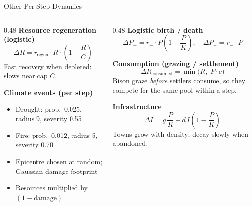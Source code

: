 \documentclass[aspectratio=169]{beamer}
\begin{document}
\begin{frame}{Other Per-Step Dynamics}
  \begin{columns}[T]
    \begin{column}{0.48\textwidth}
      \textbf{Resource regeneration (logistic)}
      \[
        \Delta R = r_\mathrm{regen}\cdot R\cdot\!\left(1 - \frac{R}{C}\right)
      \]
      Fast recovery when depleted; slows near cap $C$.

      \vspace{0.8em}
      \textbf{Climate events (per step)}
      \begin{itemize}
        \item Drought: prob.\ 0.025, radius 9, severity 0.55
        \item Fire: prob.\ 0.012, radius 5, severity 0.70
        \item Epicentre chosen at random; Gaussian damage footprint
        \item Resources multiplied by $(1 - \mathrm{damage})$
      \end{itemize}
    \end{column}
    \begin{column}{0.48\textwidth}
      \textbf{Logistic birth / death}
      \[
        \Delta P_+ = r_+\cdot P\!\left(1 - \frac{P}{K}\right), \quad
        \Delta P_- = r_-\cdot P
      \]

      \vspace{0.4em}
      \textbf{Consumption (grazing / settlement)}
      \[
        \Delta R_{\mathrm{consumed}} = \min\!\bigl(R,\; P\cdot c\bigr)
      \]
      Bison graze \emph{before} settlers consume, so they compete
      for the same pool within a step.

      \vspace{0.6em}
      \textbf{Infrastructure}
      \[
        \Delta I = g\,\frac{P}{K} - d\,I\!\left(1 - \frac{P}{K}\right)
      \]
      Towns grow with density; decay slowly when abandoned.
    \end{column}
  \end{columns}
\end{frame}
\end{document}
